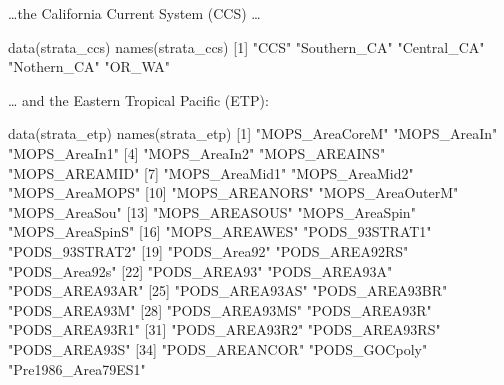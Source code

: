 \documentclass[
]{book}
\newenvironment{Shaded}{\begin{snugshade}}{\end{snugshade}}
\newcommand{\DecValTok}[1]{\textcolor[rgb]{0.00,0.00,0.81}{#1}}
\newcommand{\FunctionTok}[1]{\textcolor[rgb]{0.00,0.00,0.00}{#1}}
\newcommand{\NormalTok}[1]{#1}
\newcommand{\StringTok}[1]{\textcolor[rgb]{0.31,0.60,0.02}{#1}}
\begin{document}
\ldots the California Current System (CCS) \ldots{}

\begin{Shaded}
\begin{Highlighting}[]
\FunctionTok{data}\NormalTok{(strata\_ccs) }
\FunctionTok{names}\NormalTok{(strata\_ccs)}
\NormalTok{[}\DecValTok{1}\NormalTok{] }\StringTok{"CCS"}         \StringTok{"Southern\_CA"} \StringTok{"Central\_CA"}  \StringTok{"Nothern\_CA"}  \StringTok{"OR\_WA"}      
\end{Highlighting}
\end{Shaded}

\ldots{} and the Eastern Tropical Pacific (ETP):

\begin{Shaded}
\begin{Highlighting}[]
\FunctionTok{data}\NormalTok{(strata\_etp) }
\FunctionTok{names}\NormalTok{(strata\_etp)}
\NormalTok{ [}\DecValTok{1}\NormalTok{] }\StringTok{"MOPS\_AreaCoreM"}     \StringTok{"MOPS\_AreaIn"}        \StringTok{"MOPS\_AreaIn1"}      
\NormalTok{ [}\DecValTok{4}\NormalTok{] }\StringTok{"MOPS\_AreaIn2"}       \StringTok{"MOPS\_AREAINS"}       \StringTok{"MOPS\_AREAMID"}      
\NormalTok{ [}\DecValTok{7}\NormalTok{] }\StringTok{"MOPS\_AreaMid1"}      \StringTok{"MOPS\_AreaMid2"}      \StringTok{"MOPS\_AreaMOPS"}     
\NormalTok{[}\DecValTok{10}\NormalTok{] }\StringTok{"MOPS\_AREANORS"}      \StringTok{"MOPS\_AreaOuterM"}    \StringTok{"MOPS\_AreaSou"}      
\NormalTok{[}\DecValTok{13}\NormalTok{] }\StringTok{"MOPS\_AREASOUS"}      \StringTok{"MOPS\_AreaSpin"}      \StringTok{"MOPS\_AreaSpinS"}    
\NormalTok{[}\DecValTok{16}\NormalTok{] }\StringTok{"MOPS\_AREAWES"}       \StringTok{"PODS\_93STRAT1"}      \StringTok{"PODS\_93STRAT2"}     
\NormalTok{[}\DecValTok{19}\NormalTok{] }\StringTok{"PODS\_Area92"}        \StringTok{"PODS\_AREA92RS"}      \StringTok{"PODS\_Area92s"}      
\NormalTok{[}\DecValTok{22}\NormalTok{] }\StringTok{"PODS\_AREA93"}        \StringTok{"PODS\_AREA93A"}       \StringTok{"PODS\_AREA93AR"}     
\NormalTok{[}\DecValTok{25}\NormalTok{] }\StringTok{"PODS\_AREA93AS"}      \StringTok{"PODS\_AREA93BR"}      \StringTok{"PODS\_AREA93M"}      
\NormalTok{[}\DecValTok{28}\NormalTok{] }\StringTok{"PODS\_AREA93MS"}      \StringTok{"PODS\_AREA93R"}       \StringTok{"PODS\_AREA93R1"}     
\NormalTok{[}\DecValTok{31}\NormalTok{] }\StringTok{"PODS\_AREA93R2"}      \StringTok{"PODS\_AREA93RS"}      \StringTok{"PODS\_AREA93S"}      
\NormalTok{[}\DecValTok{34}\NormalTok{] }\StringTok{"PODS\_AREANCOR"}      \StringTok{"PODS\_GOCpoly"}       \StringTok{"Pre1986\_Area79ES1"} 

\end{Highlighting}
\end{Shaded}
\end{document}
